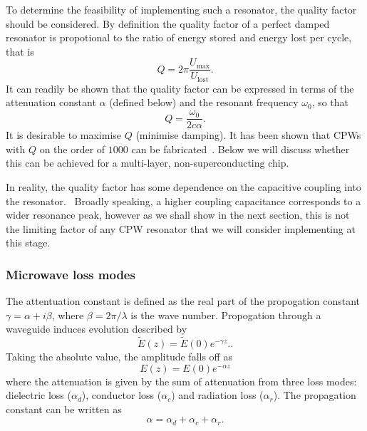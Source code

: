 To determine the feasibility of implementing such a resonator, the quality
factor should be considered. By definition the quality factor of a perfect
damped resonator is propotional to the ratio of energy stored and energy lost
per cycle, that is~
\begin{equation}
  Q = 2\pi\frac{U_\mathrm{max}}{U_\mathrm{lost}}.
  \label{experiment:mw:eqn:Qdef}
\end{equation}
It can readily be shown that the quality factor can be expressed in terms of the
attenuation constant $\alpha$ (defined below) and the resonant frequency
$\omega_0$, so that~\cite{Simons2004}
\begin{equation}
  Q = \frac{\omega_0}{2c\alpha}.
  \label{experiment:mw:eqn:Qalpha}
\end{equation}
It is desirable to maximise $Q$ (minimise damping). It has been shown that CPWs
with $Q$ on the order of $1000$ can be fabricated~. Below we will discuss whether this can be achieved for a multi-layer,
non-superconducting chip.

In reality, the quality factor has some dependence on the capacitive coupling
into the resonator.~\cite{doi:10.1063/1.3010859} Broadly speaking, a higher
coupling capacitance corresponds to a wider resonance peak, however as we shall
show in the next section, this is not the limiting factor of any CPW resonator
that we will consider implementing at this stage.

\subsubsection{Microwave loss modes}


The attentuation constant is defined as the real part of the propogation
constant $\gamma = \alpha + i\beta$, where $\beta = 2\pi / \lambda$ is the wave
number.  Propogation through a waveguide induces evolution described by
\begin{equation}
  \widetilde{E}(z) = \widetilde{E}(0)e^{-\gamma z}.
  \label{experiment:mw:eqn:Eloss}.
\end{equation}
Taking the absolute value, the amplitude falls off as
\begin{equation}
  E(z) = E(0)e^{-\alpha z}
\end{equation}
where the attenuation is given by the sum of attenuation from three loss modes:
dielectric loss ($\alpha_d$), conductor loss ($\alpha_c$) and radiation loss
($\alpha_r$). The propagation constant can be written as
\begin{equation}
  \alpha = \alpha_d + \alpha_c + \alpha_r.
\end{equation}

